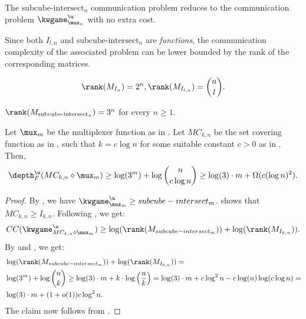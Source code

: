 \documentclass[acmsmall, nonacm, authorversion]{acmart}
\begin{document}
\begin{lemma}[{\cite[Lemma 5.10]{IK23}}]\label{lem:reduction-sub-inter-mux}
The $\text{subcube-intersect}_n$ communication problem reduces to the communication problem $\kwgame_{\mux_n}^\u$ with no extra cost.
\end{lemma}

Since both $I_{l,n}$ and $\text{subcube-intersect}_n$ are \emph{functions}, the communication complexity of the associated problem can be lower bounded by the rank of the corresponding matrices.
\begin{theorem}\label{thm:rank-of-disjointness}
\[
\rank(M_{I_n})=2^n,\rank(M_{I_{l,n}})=\binom{n}{l}.
\]
\end{theorem}

\begin{lemma}[{\cite[Lemma 5.12]{IK23}}]\label{lem:rank-subcube-intersect}
$\rank(M_{\text{subcube-intersect}_n})=3^n$ for every $n\ge1$.
\end{lemma}

\begin{proposition}
    \label{prop:comp-monotone-mux}
Let $\mux_m$ be the multiplexer function as in . Let $MC_{k,n}$ be the set covering function as in , such that $k=c\log n$ for some suitable constant $c>0$ as in . Then,
\[
\depth_{F}^\u(MC_{k,n} \diamond \mux_m) \ge \log(3^m)+\log\binom{n}{c \log n} \ge\log(3)\cdot m +\Omega(c(\log n)^2).
\]
\end{proposition}
\begin{proof} 
By , we have $\kwgame_{\mux_m}^\u\ge subcube-intersect_m$.   shows that $MC_{k,n}\ge I_{k,n}$. Following , we get:
\[
CC(\kwgame_{MC_{k,n} \diamond \mux_m}^\u) \ge \log(\rank(M_{subcube-intersect_m}))+\log(\rank(M_{I_{k,n}})).
\]
By  and , we get:
\begin{align*}
&\log(\rank(M_{subcube-intersect_m}))+\log(\rank(M_{I_{k,n}})) =\\ &\log(3^m)+\log\binom{n}{k} \ge \log(3)\cdot m+k\cdot\log\left(\frac{n}{k}\right)=\log(3)\cdot m+c\log^2 n-c\log(n)\log(c\log n)=\\
&\log(3)\cdot m + (1+o(1))c\log^2 n.
\end{align*}
The claim now follows from .
\end{proof}
\end{document}
